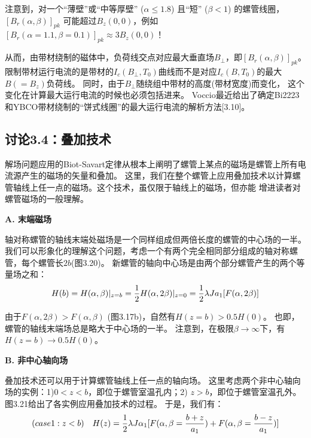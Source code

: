 注意到，对一个“薄壁”或“中等厚壁” ($\alpha \le 1.8$) 且“短” ($\beta < 1$) 的螺管线圈，
$[B_r(\alpha,\beta)]_{pk}$ 可能超过$B_z(0, 0)$，例如$[B_r(\alpha=1.1,\beta=0.1)]_{pk}\approx 3B_z(0,0)$！

从而，由带材绕制的磁体中，负荷线交点对应最大垂直场$B_{\perp}$，即$[B_r(\alpha,\beta)]_{pk}$。
限制带材运行电流的是带材的$I_c(B_{\perp},T_0)$曲线而不是对应$I_c(B, T_0)$的最大$B(=B_z)$负荷线。
同时，由于$B_{\perp}$随绕组中带材的高度(带材宽度)而变化，
这个变化在计算最大运行电流的时候也必须包括进来。
Voccio最近给出了确定Bi2223和YBCO带材绕制的“饼式线圈”的最大运行电流的解析方法[3.10]。

\newpage

\subsection{讨论3.4：叠加技术}
解场问题应用的Biot-Savart定律从根本上阐明了螺管上某点的磁场是螺管上所有电流源产生的磁场的矢量和叠加。
这里，我们在整个螺管上应用叠加技术以计算螺管轴线上任一点的磁场。这个技术，虽仅限于轴线上的磁场，但亦能
增进读者对螺管磁场的一般理解。

\textbf{A. 末端磁场}

轴对称螺管的轴线末端处磁场是一个同样组成但两倍长度的螺管的中心场的一半。
我们可以形象化的理解这个问题，考虑一个有两个完全相同部分组成的轴对称螺管，每个螺管长$2b$(图3.20)。
新螺管的轴向中心场是由两个部分螺管产生的两个等量场之和：
\begin{equation}
H(b)=H(\alpha,\beta)|_{z=b}=\frac{1}{2}H(\alpha,2\beta)|_{z=0}=\frac{1}{2}\lambda Ja_{1}[F(\alpha,2\beta)]\\%
\end{equation}

由于$F(\alpha, 2\beta)>F(\alpha,\beta)$ (图3.17b)，自然有$H(z=b)>0.5H(0)$。
也即，螺管的轴线末端场总是略大于中心场的一半。
注意到，在极限$\beta\rightarrow\infty$下，有$H(z=b)\rightarrow 0.5H(0)$。

\textbf{B. 非中心轴向场}

叠加技术还可以用于计算螺管轴线上任一点的轴向场。
这里考虑两个非中心轴向场的实例：1)$0<z<b$，即位于螺管室温孔内；2) $z > b$，即位于螺管室温孔外。
图3.21给出了各实例应用叠加技术的过程。
于是，我们有：
\begin{equation}
(case 1:z<b)\quad H(z)=\frac{1}{2}\lambda J\alpha_{1}[F(\alpha,\beta=\frac{b+z}{a_{1}})+F(\alpha,\beta=\frac{b-z}{a_{1}})]\\%
\end{equation}

